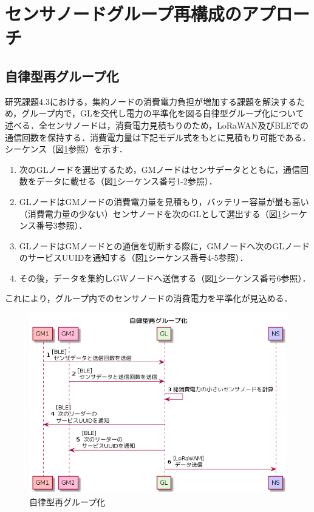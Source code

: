 \section{センサノードグループ再構成のアプローチ}

\subsection{自律型再グループ化}
研究課題4.3における，集約ノードの消費電力負担が増加する課題を解決するため，グループ内で，GLを交代し電力の平準化を図る自律型グループ化について述べる．全センサノードは，消費電力見積もりのため，LoRaWAN及びBLEでの通信回数を保持する．消費電力量は下記モデル式をもとに見積もり可能である．シーケンス（図\ref{fig:group_reconstruction_independently}参照）を示す．

\begin{enumerate}
    \item 次のGLノードを選出するため，GMノードはセンサデータとともに，通信回数をデータに載せる（図\ref{fig:group_reconstruction_independently}シーケンス番号1-2参照）．
    \item GLノードはGMノードの消費電力量を見積もり，バッテリー容量が最も高い（消費電力量の少ない）センサノードを次のGLとして選出する（図\ref{fig:group_reconstruction_independently}シーケンス番号3参照）．
    \item GLノードはGMノードとの通信を切断する際に，GMノードへ次のGLノードのサービスUUIDを通知する（図\ref{fig:group_reconstruction_independently}シーケンス番号4-5参照）．
    \item その後，データを集約しGWノードへ送信する（図\ref{fig:group_reconstruction_independently}シーケンス番号6参照）．
\end{enumerate}

これにより，グループ内でのセンサノードの消費電力を平準化が見込める．

\begin{figure}[]
    \begin{center}
    \includegraphics[width=14cm]{figures/v2.0/自律型再グループ化.png}
    \caption{自律型再グループ化}
    \label{fig:group_reconstruction_independently}
    \end{center}
\end{figure}

